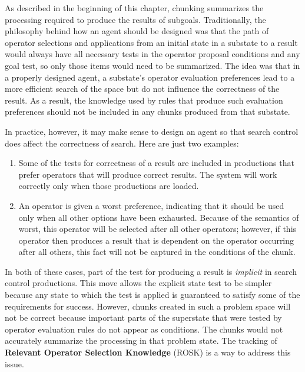 As described in the beginning of this chapter, chunking summarizes the processing required to produce the results of subgoals. Traditionally, the philosophy behind how an agent should be designed was that the path of operator selections and applications from an initial state in a substate to a result would always have all necessary tests in the operator proposal conditions and any goal test, so only those items would need to be summarized. The idea was that in a properly designed agent, a substate's operator evaluation preferences lead to a more efficient search of the space but do not influence the correctness of the result. As a result, the knowledge used by rules that produce such evaluation preferences should not be included in any chunks produced from that substate.

In practice, however, it may make sense to design an agent so that search control does affect the correctness of search. Here are just two examples:

\begin{enumerate}
	\item Some of the tests for correctness of a result are included in productions that prefer operators that will produce correct results. The system will work correctly only when those productions are loaded.

	\item An operator is given a worst preference, indicating that it should be used only when all other options have been exhausted. Because of the semantics of worst, this operator will be selected after all other operators; however, if this operator then produces a result that is dependent on the operator occurring after all others, this fact will not be captured in the conditions of the chunk.
\end{enumerate}

In both of these cases, part of the test for producing a result is \emph{implicit} in search control productions. This move allows the explicit state test to be simpler because any state to which the test is applied is guaranteed to satisfy some of the requirements for success. However, chunks created in such a problem space will not be correct because important parts of the superstate that were tested by operator evaluation rules do not appear as conditions. The chunks would not accurately summarize the processing in that problem state.  The tracking of \textbf{Relevant Operator Selection Knowledge} (ROSK) is a way to address this issue.

